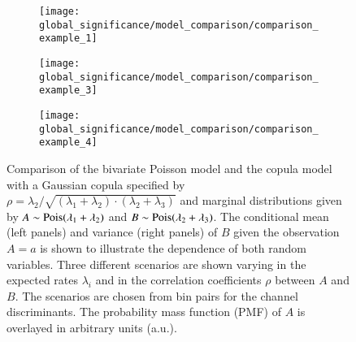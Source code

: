 \begin{figure}[htbp]
  \centering

  \begin{subfigure}{\textwidth}
    \centering
    \texttt{[image: global\_significance/model\_comparison/comparison\_example\_1]}
  \end{subfigure}

  \begin{subfigure}{\textwidth}
    \centering
    \texttt{[image: global\_significance/model\_comparison/comparison\_example\_3]}
  \end{subfigure}

  \begin{subfigure}{\textwidth}
    \centering
    \texttt{[image: global\_significance/model\_comparison/comparison\_example\_4]}
  \end{subfigure}

  \caption{Comparison of the bivariate Poisson model and the copula model with a
    Gaussian copula specified by
    $\rho = \lambda_2 / \sqrt{(\lambda_1 + \lambda_2) \cdot (\lambda_2 +
      \lambda_3)}$ and marginal distributions given by
    $A \sim \operatorname{Pois}(\lambda_1 + \lambda_2)$ and
    $B \sim \operatorname{Pois}(\lambda_2 + \lambda_3)$. The conditional mean (left panels)
    and variance (right panels) of $B$ given the observation $A = a$ is shown to
    illustrate the dependence of both random variables. Three different
    scenarios are shown varying in the expected rates $\lambda_i$ and in the
    correlation coefficients $\rho$ between $A$ and $B$. The scenarios are
    chosen from bin pairs for the \hadhad channel discriminants.  The
    probability mass function (PMF) of $A$ is overlayed in arbitrary units
    (a.u.).}%
  \label{fig:copula_model_comparison}
\end{figure}

